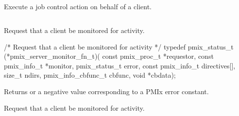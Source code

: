 \descr

Execute a job control action on behalf of a client.


\subsection{}

\summary

Request that a client be monitored for activity.

\format

\cspecificstart
\begin{codepar}
/* Request that a client be monitored for activity */
typedef pmix_status_t (*pmix_server_monitor_fn_t)(
                             const pmix_proc_t *requestor,
                             const pmix_info_t *monitor, pmix_status_t error,
                             const pmix_info_t directives[], size_t ndirs,
                             pmix_info_cbfunc_t cbfunc, void *cbdata);
\end{codepar}
\cspecificend

\begin{arglist}
\end{arglist}

Returns  or a negative value corresponding to a PMIx error constant.

\descr

Request that a client be monitored for activity.


